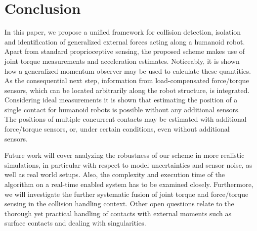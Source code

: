 
\section{Conclusion}
\label{sec:conclusion}
In this paper, we propose a unified framework for collision detection, isolation and identification of generalized external forces acting along a humanoid robot.
Apart from standard proprioceptive sensing, the proposed scheme makes use of joint torque measurements and acceleration estimates.
Noticeably, it is shown how a generalized momentum observer may be used to calculate these quantities.
As the consequential next step, information from load-compensated force/torque sensors, which can be located arbitrarily along the robot structure, is integrated.
Considering ideal measurements it is shown that estimating the position of a single contact for humanoid robots is possible without any additional sensors.
The positions of multiple concurrent contacts may be estimated with additional force/torque sensors, or, under certain conditions, even without additional sensors.

Future work will cover analyzing the robustness of our scheme in more realistic simulations, in particular with respect to model uncertainties and sensor noise, as well as real world setups.
Also, the complexity and execution time of the algorithm on a real-time enabled system has to be examined closely.
Furthermore, we will investigate the further systematic fusion of joint torque and force/torque sensing in the collision handling context.
Other open questions relate to the thorough yet practical handling of contacts with external moments such as surface contacts and dealing with singularities.

%


